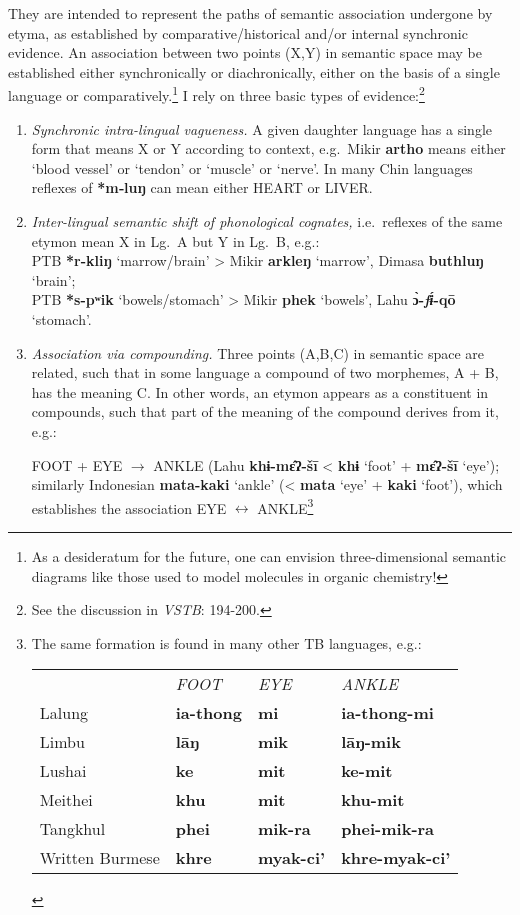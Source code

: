 They are intended to represent the paths of semantic association undergone by etyma,
as established by comparative/historical and/or internal synchronic evidence. An
association between two points (X,Y) in semantic space may be established either
synchronically or diachronically, either on the basis of a single language or
comparatively.\footnote{As a desideratum for the future, one can envision
three-dimensional semantic diagrams like those used to model molecules in
organic chemistry!}  I rely on three basic types of evidence:\footnote{See the
discussion in \textit{VSTB}: 194-200.}
\begin{enumerate}
\item
\textit{Synchronic intra-lingual vagueness.} A given daughter language has a single
form that means X or Y according to context, e.g.\ 
Mikir \textbf{artho} means either ‘blood vessel’ or ‘tendon’ or ‘muscle’ or ‘nerve’.
In many Chin languages reflexes of \textbf{*m‑luŋ} can mean either HEART or LIVER.
\item
\textit{Inter-lingual semantic shift of phonological cognates,} i.e.\ reflexes of the
same etymon mean X in Lg.~A but Y in Lg.~B, e.g.:\\
\hspace*{2ex}PTB \textbf{*r-kliŋ} ‘marrow/brain’ > Mikir \textbf{arkleŋ} ‘marrow’, Dimasa \textbf{buthluŋ} ‘brain’;\\
\hspace*{2ex}PTB \textbf{*s-pʷik} ‘bowels/stomach’ > Mikir \textbf{phek} ‘bowels’, Lahu \textbf{ɔ̀-\textit{fɨ́}-qō} ‘stomach’.
\item
\textit{Association via compounding.}  Three points (A,B,C) in semantic space are
related, such that in some language a compound of two morphemes, A + B, has the
meaning C.  In other words, an etymon appears as a constituent in compounds,
such that part of the meaning of the compound derives from it, e.g.:

FOOT + EYE $\to$ ANKLE (Lahu \textbf{khɨ-mɛ̂ʔ-šī} < \textbf{khɨ} ‘foot’ + \textbf{mɛ̂ʔ-šī} ‘eye’);
similarly Indonesian \textbf{mata-kaki} ‘ankle’ (< \textbf{mata} ‘eye’ + \textbf{kaki} ‘foot’), which
establishes the association EYE $\longleftrightarrow$ ANKLE\footnote{The same formation is
found in many other TB languages, e.g.:

\begin{tabular}{llll}
				&\textit{FOOT}	&\textit{EYE}	&\textit{ANKLE}\\
Lalung			&\textbf{ia-thong}	&\textbf{mi}	&\textbf{ia-thong-mi}\\
Limbu			&\textbf{lāŋ}	&\textbf{mik}	&\textbf{lāŋ-mik}\\
Lushai			&\textbf{ke}		&\textbf{mit}	&\textbf{ke-mit}\\
Meithei			&\textbf{khu}	&\textbf{mit}	&\textbf{khu-mit}\\
Tangkhul		&\textbf{phei}	&\textbf{mik-ra}	&\textbf{phei-mik-ra}\\
Written Burmese	&\textbf{khre}	&\textbf{myak-ci’}	&\textbf{khre-myak-ci’}\\
\end{tabular}}
\end{enumerate}

